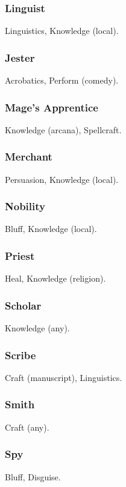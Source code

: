 \subsubsection{Linguist}
 Linguistics, Knowledge (local).

\subsubsection{Jester}
 Acrobatics, Perform (comedy).

\subsubsection{Mage's Apprentice}
 Knowledge (arcana), Spellcraft.

\subsubsection{Merchant}
 Persuasion, Knowledge (local).

\subsubsection{Nobility}
 Bluff, Knowledge (local).

\subsubsection{Priest}
 Heal, Knowledge (religion).

\subsubsection{Scholar}
 Knowledge (any).

\subsubsection{Scribe}
 Craft (manuscript), Linguistics.

\subsubsection{Smith}
 Craft (any).

\subsubsection{Spy}
 Bluff, Disguise.

